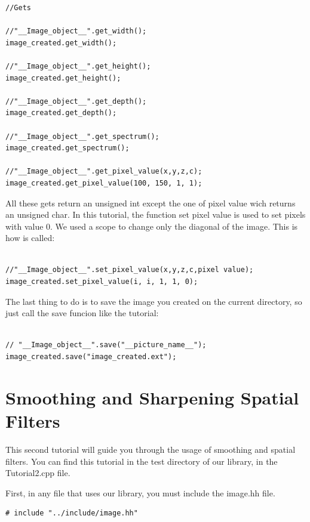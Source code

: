 \documentclass[a4paper]{article}
\begin{document}
\begin{lstlisting}
//Gets

//"__Image_object__".get_width();	    
image_created.get_width();

//"__Image_object__".get_height();
image_created.get_height();

//"__Image_object__".get_depth();
image_created.get_depth(); 
	
//"__Image_object__".get_spectrum();    
image_created.get_spectrum(); 

//"__Image_object__".get_pixel_value(x,y,z,c);
image_created.get_pixel_value(100, 150, 1, 1); 

\end{lstlisting}

All these gets return an unsigned int except the one of pixel value wich returns an unsigned char.
In this tutorial, the function set pixel value is used to set pixels with value 0. We used a scope to change only the diagonal of the image. This is how is called:

\begin{lstlisting}

//"__Image_object__".set_pixel_value(x,y,z,c,pixel value);
image_created.set_pixel_value(i, i, 1, 1, 0); 

\end{lstlisting}

The last thing to do is to save the image you created on the current directory, so just call the  save funcion like the tutorial:

\begin{lstlisting}

// "__Image_object__".save("__picture_name__");
image_created.save("image_created.ext");

\end{lstlisting}

\section{Smoothing and Sharpening Spatial Filters}

This second tutorial will guide you through the usage of smoothing and spatial filters. You can find this tutorial in the test directory of our library, in the Tutorial2.cpp file.

First, in any file that uses our library, you must include the image.hh file.


\begin{lstlisting}
# include "../include/image.hh"
\end{lstlisting}
\end{document}
